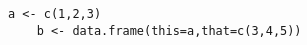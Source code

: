 \lipsum[1-2]\citep[vgl.][S. 95]{Sennet:2013aa}

\lstset{language=R}
\begin{lstlisting}[caption=R Code]
	a <- c(1,2,3)
	b <- data.frame(this=a,that=c(3,4,5))
\end{lstlisting}

\lipsum[1-2]\citep[vgl.][]{Vitello:2011aa}